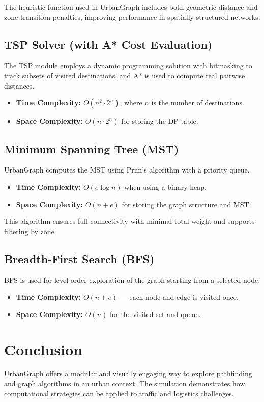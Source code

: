 \documentclass[12pt]{article}
\begin{document}
The heuristic function used in UrbanGraph includes both geometric distance and zone transition penalties, improving performance in spatially structured networks.

\subsection*{TSP Solver (with A* Cost Evaluation)}

The TSP module employs a dynamic programming solution with bitmasking to track subsets of visited destinations, and A* is used to compute real pairwise distances.

\begin{itemize}
    \item \textbf{Time Complexity:} \( O(n^2 \cdot 2^n) \), where \( n \) is the number of destinations.
    \item \textbf{Space Complexity:} \( O(n \cdot 2^n) \) for storing the DP table.
\end{itemize}


\subsection*{Minimum Spanning Tree (MST)}

UrbanGraph computes the MST using Prim’s algorithm with a priority queue.

\begin{itemize}
    \item \textbf{Time Complexity:} \( O(e \log n) \) when using a binary heap.
    \item \textbf{Space Complexity:} \( O(n + e) \) for storing the graph structure and MST.
\end{itemize}

This algorithm ensures full connectivity with minimal total weight and supports filtering by zone.

\subsection*{Breadth-First Search (BFS)}

BFS is used for level-order exploration of the graph starting from a selected node.

\begin{itemize}
    \item \textbf{Time Complexity:} \( O(n + e) \) — each node and edge is visited once.
    \item \textbf{Space Complexity:} \( O(n) \) for the visited set and queue.
\end{itemize}

\section{Conclusion}
UrbanGraph offers a modular and visually engaging way to explore pathfinding and graph algorithms in an urban context. The simulation demonstrates how computational strategies can be applied to traffic and logistics challenges.

\end{document}
